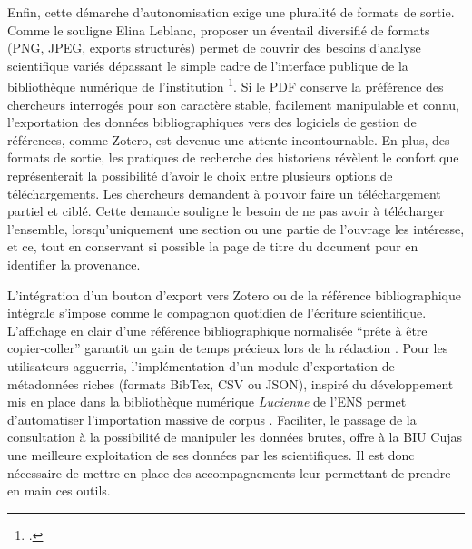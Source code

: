 Enfin, cette démarche d'autonomisation exige une pluralité de formats de sortie. Comme le souligne Elina Leblanc, proposer un éventail diversifié de formats (\ac{PNG}, \ac{JPEG}, exports structurés) permet de couvrir des besoins d'analyse scientifique variés dépassant le simple cadre de l'interface publique de la bibliothèque numérique de l'institution \footcite{leblancBibliothequesNumeriquesEnrichies}. Si le \ac{PDF} conserve la préférence des chercheurs interrogés pour son caractère stable, facilement manipulable et connu, l'exportation des données bibliographiques vers des logiciels de gestion de références, comme Zotero, est devenue une attente incontournable. En plus, des formats de sortie, les pratiques de recherche des historiens révèlent le confort que représenterait la possibilité d'avoir le choix entre plusieurs options de téléchargements. Les chercheurs demandent à pouvoir faire un téléchargement partiel et ciblé. Cette demande souligne le besoin de ne pas avoir à télécharger l'ensemble, lorsqu'uniquement une section ou une partie de l'ouvrage les intéresse, et ce, tout en conservant si possible la page de titre du document pour en identifier la provenance.

L'intégration d'un bouton d'export vers Zotero ou de la référence bibliographique intégrale s'impose comme le compagnon quotidien de l'écriture scientifique. L'affichage en clair d'une référence bibliographique normalisée \enquote{prête à être copier-coller} garantit un gain de temps précieux lors de la rédaction . Pour les utilisateurs agguerris, l'implémentation d'un module d'exportation de métadonnées riches (formats BibTex, \ac{CSV} ou \ac{JSON}), inspiré du développement mis en place dans la bibliothèque numérique \textit{Lucienne} de l'ENS permet d'automatiser l'importation massive de corpus . Faciliter, le passage de la consultation à la possibilité de manipuler les données brutes, offre à la \ac{BIU Cujas} une meilleure exploitation de ses données par les scientifiques. Il est donc nécessaire de mettre en place des accompagnements leur permettant de prendre en main ces outils.